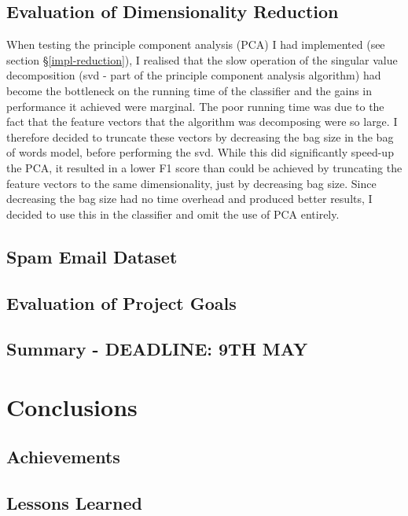 \documentclass[12pt,a4paper,twoside,openright]{report}
\begin{document}
\section{Evaluation of Dimensionality Reduction} \label{eval-reduction}

When testing the principle component analysis (PCA) I had implemented (see section \S\ref{impl-reduction}), I realised that the slow operation of the singular value decomposition (svd - part of the principle component analysis algorithm) had become the bottleneck on the running time of the classifier and the gains in performance it achieved were marginal. The poor running time was due to the fact that the feature vectors that the algorithm was decomposing were so large. I therefore decided to truncate these vectors by decreasing the bag size in the bag of words model, before performing the svd. While this did significantly speed-up the PCA, it resulted in a lower F1 score than could be achieved by truncating the feature vectors to the same dimensionality, just by decreasing bag size. Since decreasing the bag size had no time overhead and produced better results, I decided to use this in the classifier and omit the use of PCA entirely.


\section{Spam Email Dataset} \label{eval-spam}
\section{Evaluation of Project Goals} \label{eval-goals}


\section{Summary - DEADLINE: 9TH MAY}


\chapter{Conclusions} \label{conc}

\section{Achievements}

\section{Lessons Learned}
\end{document}
